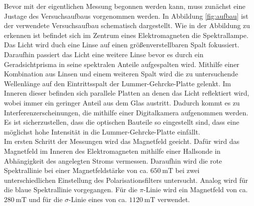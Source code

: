 Bevor mit der eigentlichen Messung begonnen werden kann, muss zunächst eine Justage des Versuchsaufbaus
vorgenommen werden. In Abbildung \ref{fig:aufbau} ist der verwendete Versuchsaufbau schematisch
dargestellt.
Wie in der Abbildung zu erkennen ist befindet sich im Zentrum eines Elektromagneten die Spektrallampe. Das Licht
wird duch eine Linse auf einen größenverstellbaren Spalt fokussiert. Daraufhin passiert das Licht eine
weitere Linse bevor es durch ein Geradsichtprisma in seine spektralen Anteile aufgespalten wird.
Mithilfe einer Kombination aus Linsen und einem weiteren Spalt wird die zu untersuchende Wellenlänge
auf den Eintrittsspalt der Lummer-Gehrcke-Platte gelenkt. Im Inneren dieser befinden sich parallele Platten
an denen das Licht reflektiert wird, wobei immer ein geringer Anteil aus dem Glas austritt.
Dadurch kommt es zu Interferenzerscheinungen, die mithilfe einer Digitalkamera aufgenommen werden.\\
Es ist sicherzustellen, dass die optischen Bauteile so eingestellt sind, dass eine möglichst hohe
Intensität in die Lummer-Gehrcke-Platte einfällt. \\
Im ersten Schritt der Messungen wird das Magnetfeld geeicht. Dafür wird das Magnetfeld im Inneren
des Elektromagneten mithilfe einer Hallsonde in Abhängigkeit des angelegten Stroms vermessen.
Daraufhin wird die rote Spektrallinie bei einer Magnetfeldstärke von ca. $\SI{650}{\milli\tesla}$ bei zwei
unterschiedlichen Einstellung des Polarisationsfilters untersucht. Analog wird für die blaue
Spektrallinie vorgegangen. Für die $\pi$-Linie wird ein Magnetfeld von ca. $\SI{280}{\milli\tesla}$
und für die $\sigma$-Linie eines von ca. $\SI{1120}{\milli\tesla}$ verwendet.
